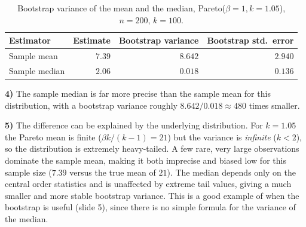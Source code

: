 \begin{table}[H]
    \centering
    \caption{Bootstrap variance of the mean and the median,
             Pareto($\beta=1, k=1.05$), $n=200$, $k=100$.}
    \label{tab:part3}
    \renewcommand{\arraystretch}{1.1}
    \begin{tabular}{lrrr}
        \toprule
        Estimator & Estimate & Bootstrap variance & Bootstrap std.\ error \\
        \midrule
        Sample mean   & $7.39$ & $8.642$ & $2.940$ \\
        Sample median & $2.06$ & $0.018$ & $0.136$ \\
        \bottomrule
    \end{tabular}
\end{table}

\textbf{4)} The sample median is far more precise  than the sample
mean for this distribution, with a bootstrap variance roughly $8.642 / 0.018 \approx 480$ times
smaller.

\textbf{5)} The difference can be explained by the underlying distribution. For
$k=1.05$ the Pareto mean is finite ($\beta k/(k-1)=21$) but the variance is
\emph{infinite} ($k<2$), so the distribution is extremely heavy-tailed. A few
rare, very large observations dominate the sample mean, making it both imprecise
and biased low for this sample size ($7.39$ versus the true mean of $21$). The
median depends only on the central order statistics and is unaffected by extreme
tail values, giving a much smaller and more stable bootstrap variance. This is a good example of when the bootstrap is useful (slide 5), since
there is no simple formula for the variance of the median.